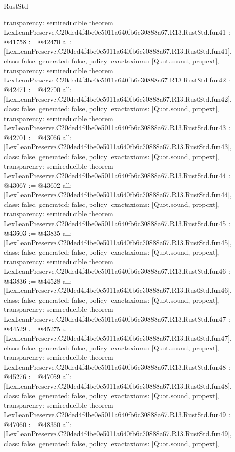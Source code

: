\begin{lexlean}{RustStd}
\begin{coremodule}
{  transparency: semireducible
}
theorem LexLeanPreserve.C20ded4f4be0e5011a640fb6c30888a67.R13.RustStd.fun41 : @41758 := @42470 {
  all: [LexLeanPreserve.C20ded4f4be0e5011a640fb6c30888a67.R13.RustStd.fun41],
  class: false,
  generated: false,
  policy: exact{axioms: [Quot.sound, propext]},
  transparency: semireducible
}
theorem LexLeanPreserve.C20ded4f4be0e5011a640fb6c30888a67.R13.RustStd.fun42 : @42471 := @42700 {
  all: [LexLeanPreserve.C20ded4f4be0e5011a640fb6c30888a67.R13.RustStd.fun42],
  class: false,
  generated: false,
  policy: exact{axioms: [Quot.sound, propext]},
  transparency: semireducible
}
theorem LexLeanPreserve.C20ded4f4be0e5011a640fb6c30888a67.R13.RustStd.fun43 : @42701 := @43066 {
  all: [LexLeanPreserve.C20ded4f4be0e5011a640fb6c30888a67.R13.RustStd.fun43],
  class: false,
  generated: false,
  policy: exact{axioms: [Quot.sound, propext]},
  transparency: semireducible
}
theorem LexLeanPreserve.C20ded4f4be0e5011a640fb6c30888a67.R13.RustStd.fun44 : @43067 := @43602 {
  all: [LexLeanPreserve.C20ded4f4be0e5011a640fb6c30888a67.R13.RustStd.fun44],
  class: false,
  generated: false,
  policy: exact{axioms: [Quot.sound, propext]},
  transparency: semireducible
}
theorem LexLeanPreserve.C20ded4f4be0e5011a640fb6c30888a67.R13.RustStd.fun45 : @43603 := @43835 {
  all: [LexLeanPreserve.C20ded4f4be0e5011a640fb6c30888a67.R13.RustStd.fun45],
  class: false,
  generated: false,
  policy: exact{axioms: [Quot.sound, propext]},
  transparency: semireducible
}
theorem LexLeanPreserve.C20ded4f4be0e5011a640fb6c30888a67.R13.RustStd.fun46 : @43836 := @44528 {
  all: [LexLeanPreserve.C20ded4f4be0e5011a640fb6c30888a67.R13.RustStd.fun46],
  class: false,
  generated: false,
  policy: exact{axioms: [Quot.sound, propext]},
  transparency: semireducible
}
theorem LexLeanPreserve.C20ded4f4be0e5011a640fb6c30888a67.R13.RustStd.fun47 : @44529 := @45275 {
  all: [LexLeanPreserve.C20ded4f4be0e5011a640fb6c30888a67.R13.RustStd.fun47],
  class: false,
  generated: false,
  policy: exact{axioms: [Quot.sound, propext]},
  transparency: semireducible
}
theorem LexLeanPreserve.C20ded4f4be0e5011a640fb6c30888a67.R13.RustStd.fun48 : @45276 := @47059 {
  all: [LexLeanPreserve.C20ded4f4be0e5011a640fb6c30888a67.R13.RustStd.fun48],
  class: false,
  generated: false,
  policy: exact{axioms: [Quot.sound, propext]},
  transparency: semireducible
}
theorem LexLeanPreserve.C20ded4f4be0e5011a640fb6c30888a67.R13.RustStd.fun49 : @47060 := @48360 {
  all: [LexLeanPreserve.C20ded4f4be0e5011a640fb6c30888a67.R13.RustStd.fun49],
  class: false,
  generated: false,
  policy: exact{axioms: [Quot.sound, propext]},
}
\end{coremodule}
\end{lexlean}
